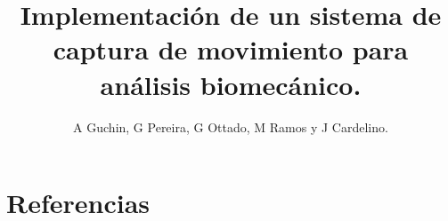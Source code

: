 \documentclass[a4paper]{jpconf}
\begin{document}
\title{Implementación de un sistema de captura de movimiento para análisis biomecánico.}

\author{A Guchin, G Pereira, G Ottado, M Ramos y J Cardelino.}

\address{Instituto de Ingenier\'ia El\'ectrica, Facultad de Ingeniería, Universidad de la Rep\'ublica, Uruguay.}












\section*{Referencias}


\end{document}
